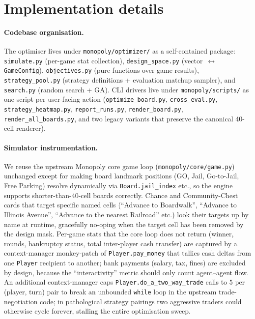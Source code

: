 \documentclass[10pt]{article}
\begin{document}
\appendix

\section{Implementation details}\label{app:impl}

\paragraph{Codebase organisation.} The optimiser lives under
\texttt{monopoly/optimizer/} as a self-contained package: \texttt{simulate.py}
(per-game stat collection), \texttt{design\_space.py} (vector~$\leftrightarrow$
\texttt{GameConfig}), \texttt{objectives.py} (pure functions over game
results), \texttt{strategy\_pool.py} (strategy definitions + evaluation
matchup sampler), and \texttt{search.py} (random search + GA). CLI drivers
live under \texttt{monopoly/scripts/} as one script per user-facing action
(\texttt{optimize\_board.py}, \texttt{cross\_eval.py},
\texttt{strategy\_heatmap.py}, \texttt{report\_runs.py},
\texttt{render\_board.py}, \texttt{render\_all\_boards.py}, and two legacy
variants that preserve the canonical 40-cell renderer).

\paragraph{Simulator instrumentation.} We reuse the upstream Monopoly core
game loop (\texttt{monopoly/core/game.py}) unchanged except for making
board landmark positions (GO, Jail, Go-to-Jail, Free Parking) resolve
dynamically via \texttt{Board.jail\_index} etc., so the engine supports
shorter-than-40-cell boards correctly. Chance and Community-Chest cards
that target specific named cells (``Advance to Boardwalk'',
``Advance to Illinois Avenue'', ``Advance to the nearest Railroad''
etc.) look their targets up by name at runtime, gracefully no-oping
when the target cell has been removed by the design mask. Per-game
stats that the core loop does not return (winner, rounds, bankruptcy
status, total inter-player cash transfer) are captured by a
context-manager monkey-patch of \texttt{Player.pay\_money} that tallies
cash deltas from one \texttt{Player} recipient to another; bank
payments (salary, tax, fines) are excluded by design, because the
``interactivity'' metric should only count agent--agent flow. An
additional context-manager caps
\texttt{Player.do\_a\_two\_way\_trade} calls to $5$ per (player, turn)
pair to break an unbounded \texttt{while} loop in the upstream
trade-negotiation code; in pathological strategy pairings two
aggressive traders could otherwise cycle forever, stalling the entire
optimisation sweep.
\end{document}

